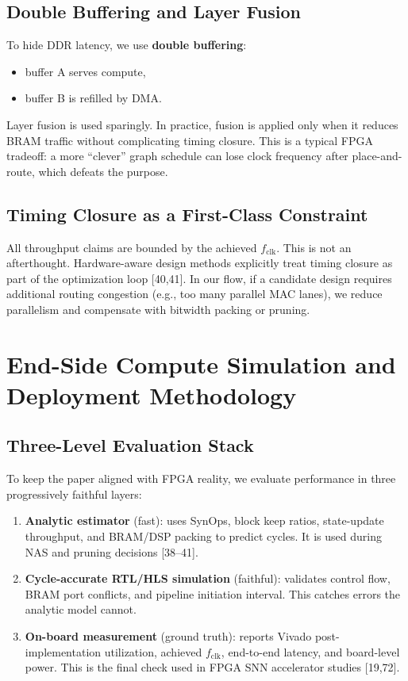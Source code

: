 \documentclass[10pt,journal,compsoc]{IEEEtran}
\begin{document}
\subsection{Double Buffering and Layer Fusion}
To hide DDR latency, we use \textbf{double buffering}:
\begin{itemize}
    \item buffer A serves compute,
    \item buffer B is refilled by DMA.
\end{itemize}
Layer fusion is used sparingly. In practice, fusion is applied only when it reduces BRAM traffic without complicating timing closure. This is a typical FPGA tradeoff: a more ``clever'' graph schedule can lose clock frequency after place-and-route, which defeats the purpose.

\subsection{Timing Closure as a First-Class Constraint}
All throughput claims are bounded by the achieved $f_{\text{clk}}$. This is not an afterthought. Hardware-aware design methods explicitly treat timing closure as part of the optimization loop [40,41]. In our flow, if a candidate design requires additional routing congestion (e.g., too many parallel MAC lanes), we reduce parallelism and compensate with bitwidth packing or pruning.

\section{End-Side Compute Simulation and Deployment Methodology}

\subsection{Three-Level Evaluation Stack}
To keep the paper aligned with FPGA reality, we evaluate performance in three progressively faithful layers:
\begin{enumerate}
    \item \textbf{Analytic estimator} (fast): uses SynOps, block keep ratios, state-update throughput, and BRAM/DSP packing to predict cycles. It is used during NAS and pruning decisions [38--41].
    \item \textbf{Cycle-accurate RTL/HLS simulation} (faithful): validates control flow, BRAM port conflicts, and pipeline initiation interval. This catches errors the analytic model cannot.
    \item \textbf{On-board measurement} (ground truth): reports Vivado post-implementation utilization, achieved $f_{\text{clk}}$, end-to-end latency, and board-level power. This is the final check used in FPGA SNN accelerator studies [19,72].
\end{enumerate}
\end{document}

